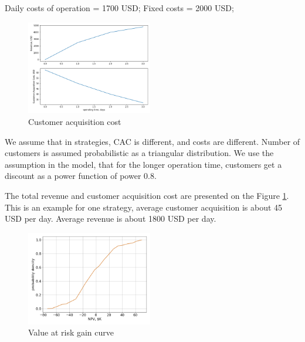 Daily costs of operation = 1700 USD; Fixed costs = 2000 USD;


\begin{figure}
  \includegraphics[width=0.49\textwidth]{img/fin/varg_10runs.png}
  \caption{Customer acquisition cost}
  \label{fig:cac}
\end{figure}

We assume that in strategies, CAC is different, and costs are different. Number of customers is assumed probabilistic as a triangular distribution. We use the assumption in the model, that for the longer operation time, customers get a discount as a power function of power 0.8.

The total revenue and customer acquisition cost are presented on the Figure \ref{fig:cac}. This is an example for one strategy, average customer acquisition is about 45 USD per day. Average revenue is about 1800 USD per day.



\begin{figure}
  \includegraphics[width=0.49\textwidth]{img/fin/varg_mruns.png}
  \caption{Value at risk gain curve}
  \label{fig:signal}
\end{figure}

